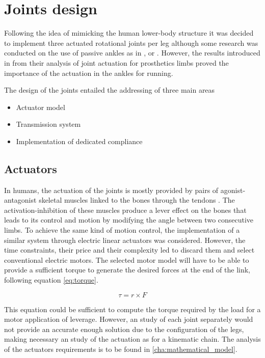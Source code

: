 \section{Joints design} %
\label{sec:joints}
Following the idea of mimicking the human lower-body structure it was decided to implement three actuated rotational joints per leg although some research was conducted on the use of passive ankles as in \cite{dacbot1}, \cite{phides} or \cite{mabel}.
However, the results introduced in \cite{grimmer} from their analysis of joint actuation for prosthetics limbs proved the importance of the actuation in the ankles for running.

The design of the joints entailed the addressing of three main areas

\begin{itemize}
  \item Actuator model
  \item Transmission system
  \item Implementation of dedicated compliance
\end{itemize}

\subsection{Actuators} %
\label{sub:actuators}
In humans, the actuation of the joints is mostly provided by pairs of agonist-antagonist skeletal muscles linked to the bones through the tendons \cite{anatomy}.
The activation-inhibition of these muscles produce a lever effect on the bones that leads to its control and motion by modifying the angle between two consecutive limbs.
To achieve the same kind of motion control, the implementation of a similar system through electric linear actuators was considered.
However, the time constraints, their price and their complexity led to discard them and select conventional electric motors.
The selected motor model will have to be able to provide a sufficient torque to generate the desired forces at the end of the link, following equation \ref{eq:torque}.

\begin{equation}
\label{eq:torque}
  \tau = r \times F
\end{equation}

This equation could be sufficient to compute the torque required by the load for a motor application of leverage. 
However, an study of each joint separately would not provide an accurate enough solution due to the configuration of the legs, making necessary an study of the actuation as for a kinematic chain.
The analysis of the actuators requirements is to be found in \ref{cha:mathematical_model}.

